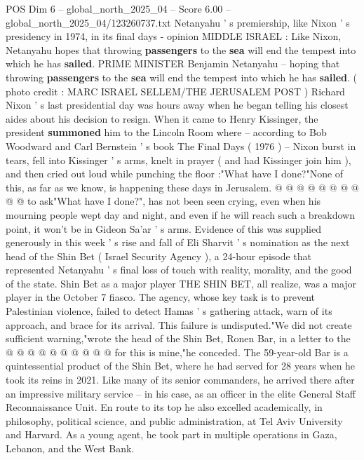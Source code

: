 \begin{textsample}{POS Dim 6 – global\_north\_2025\_04 – Score 6.00 – global\_north\_2025\_04/123260737.txt}  \label{ex:f6_pos_205}
Netanyahu ' s premiership, like Nixon ' s presidency in 1974, in its final days - opinion MIDDLE ISRAEL : Like Nixon, Netanyahu hopes that throwing \textbf{passengers} to the \textbf{sea} will end the tempest into which he has \textbf{sailed}.
PRIME MINISTER Benjamin Netanyahu -- hoping that throwing \textbf{passengers} to the \textbf{sea} will end the tempest into which he has \textbf{sailed}. ( photo credit : MARC ISRAEL SELLEM/THE JERUSALEM POST ) Richard Nixon ' s last presidential day was hours away when he began telling his closest aides about his decision to resign.
When it came to Henry Kissinger, the president \textbf{summoned} him to the Lincoln Room where -- according to Bob Woodward and Carl Bernstein ' s book The Final Days ( 1976 ) -- Nixon burst in tears, fell into Kissinger ' s arms, knelt in prayer ( and had Kissinger join him ), and then cried out loud while punching the floor :"What have I done?"None of this, as far as we know, is happening these days in Jerusalem. @ @ @ @ @ @ @ @ @ @ to ask"What have I done?", has not been seen crying, even when his mourning people wept day and night, and even if he will reach such a breakdown point, it won't be in Gideon Sa'ar ' s arms.
Evidence of this was supplied generously in this week ' s rise and fall of Eli Sharvit ' s nomination as the next head of the Shin Bet ( Israel Security Agency ), a 24-hour episode that represented Netanyahu ' s final loss of touch with reality, morality, and the good of the state.
Shin Bet as a major player THE SHIN BET, all realize, was a major player in the October 7 fiasco.
The agency, whose key task is to prevent Palestinian violence, failed to detect Hamas ' s gathering attack, warn of its approach, and brace for its arrival.
This failure is undisputed."We did not create sufficient warning,"wrote the head of the Shin Bet, Ronen Bar, in a letter to the @ @ @ @ @ @ @ @ @ @ for this is mine,"he conceded.
The 59-year-old Bar is a quintessential product of the Shin Bet, where he had served for 28 years when he took its reins in 2021.
Like many of its senior commanders, he arrived there after an impressive military service -- in his case, as an officer in the elite General Staff Reconnaissance Unit.
En route to its top he also excelled academically, in philosophy, political science, and public administration, at Tel Aviv University and Harvard.
As a young agent, he took part in multiple operations in Gaza, Lebanon, and the West Bank.

\end{textsample}
